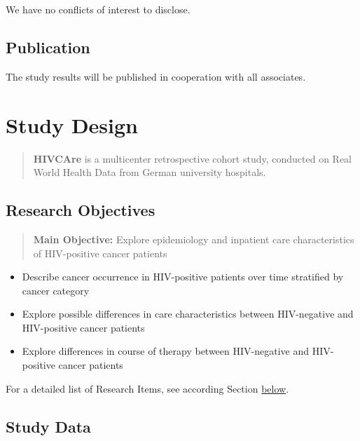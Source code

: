 \documentclass[
  letterpaper,
  DIV=11,
  numbers=noendperiod]{scrreprt}
\begin{document}
We have no conflicts of interest to disclose.

\hypertarget{publication}{%
\section{Publication}\label{publication}}

The study results will be published in cooperation with all associates.

\hypertarget{study-design}{%
\chapter{Study Design}\label{study-design}}

\begin{quote}
\textbf{HIVCAre} is a multicenter retrospective cohort study, conducted
on Real World Health Data from German university hospitals.
\end{quote}

\hypertarget{section-ResearchObjectives}{%
\section{Research Objectives}\label{section-ResearchObjectives}}

\begin{quote}
\textbf{Main Objective:} Explore epidemiology and inpatient care
characteristics of HIV-positive cancer patients
\end{quote}

\begin{itemize}
\item
  Describe cancer occurrence in HIV-positive patients over time
  stratified by cancer category
\item
  Explore possible differences in care characteristics between
  HIV-negative and HIV-positive cancer patients
\item
  Explore differences in course of therapy between HIV-negative and
  HIV-positive cancer patients
\end{itemize}

For a detailed list of Research Items, see according Section
\protect\hyperlink{section-ResearchItems}{below}.

\hypertarget{study-data}{%
\section{Study Data}\label{study-data}}
\end{document}
